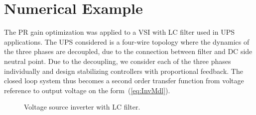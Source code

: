 \documentclass[conference,10pt]{IEEEtran}
\begin{document}
\section{Numerical Example}

The PR gain optimization was applied to a VSI with LC filter used in UPS applications.
The UPS considered is a four-wire topology where the dynamics of the three phases are decoupled, due to the connection between filter and DC side neutral point. Due to the decoupling, we consider each of the three phases individually and design stabilizing controllers with proportional feedback. The closed loop system thus becomes a second order transfer function from voltage reference to output voltage on the form~(\ref{eq:InvMdl}).
\begin{figure}[!h]
\centering
{}
\psfrag{+}{\tiny{$+$}}
\scalebox{0.9}{

}
\caption{Voltage source inverter with LC filter.}
\label{fig:UPS_LC}
\end{figure}
\end{document}
